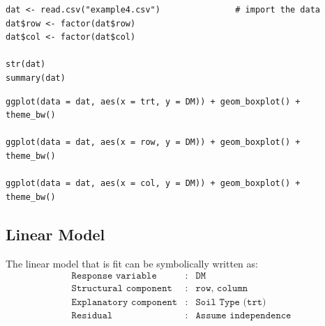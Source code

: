 \documentclass[a4paper, 10pt, fleqn, twosided]{memoir}
\begin{document}
\begin{tcolorbox}[title = Import and graph the data]
\begin{verbatim}
dat <- read.csv("example4.csv")               # import the data
dat$row <- factor(dat$row)
dat$col <- factor(dat$col)

str(dat)
summary(dat)
\end{verbatim}
\tcblower
\begin{verbatim}
ggplot(data = dat, aes(x = trt, y = DM)) + geom_boxplot() +
theme_bw()

ggplot(data = dat, aes(x = row, y = DM)) + geom_boxplot() +
theme_bw()

ggplot(data = dat, aes(x = col, y = DM)) + geom_boxplot() +
theme_bw()
\end{verbatim}
\end{tcolorbox}


\subsection{Linear Model}
The linear model that is fit can be symbolically written as:
\begin{eqnarray*}
	\texttt{Response variable}&:& \texttt{DM} \\
	\texttt{Structural component}&:& \texttt{row, column}\\
	\texttt{Explanatory component}&:& \texttt{Soil Type (trt)}\\
	\texttt{Residual}&:& \texttt{Assume independence}
\end{eqnarray*}
\end{document}

